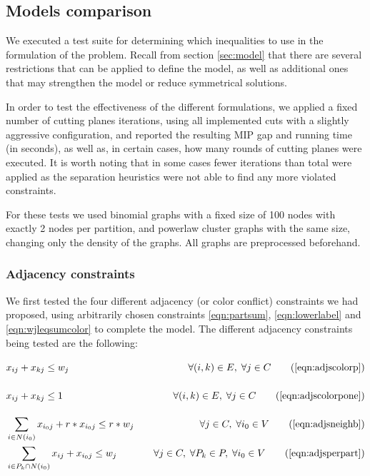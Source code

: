 
\subsection{Models comparison}

We executed a test suite for determining which inequalities to use in the formulation of the problem. Recall from section \ref{sec:model} that there are several restrictions that can be applied to define the model, as well as additional ones that may strengthen the model or reduce symmetrical solutions.

In order to test the effectiveness of the different formulations, we applied a fixed number of cutting planes iterations, using all implemented cuts with a slightly aggressive configuration, and reported the resulting MIP gap and running time (in seconds), as well as, in certain cases, how many rounds of cutting planes were executed. It is worth noting that in some cases fewer iterations than total were applied as the separation heuristics were not able to find any more violated constraints.

For these tests we used binomial graphs with a fixed size of 100 nodes with exactly 2 nodes per partition, and powerlaw cluster graphs with the same size, changing only the density of the graphs. All graphs are preprocessed beforehand.

\subsubsection*{Adjacency constraints}

We first tested the four different adjacency (or color conflict) constraints we had proposed, using arbitrarily chosen constraints \ref{eqn:partsum}, \ref{eqn:lowerlabel} and \ref{eqn:wjleqsumcolor} to complete the model. The different adjacency constraints being tested are the following: 

\begin{align*}
&x_{ij} + x_{kj} \leq w_j \sumheight &\quad \forall (i,k) \in E, \; \forall j \in C \tag{\ref{eqn:adjscolorp}} \\
&x_{ij} + x_{kj} \leq 1 \sumheight &\quad \forall (i,k) \in E, \; \forall j \in C \tag{\ref{eqn:adjscolorpone}} \\
&\sum_{i \in N(i_0)} x_{i_0j} + r * x_{i_0j} \leq r * w_j &\quad \forall j \in C, \; \forall i_0 \in V \tag{\ref{eqn:adjsneighb}} \\
&\sum_{i \in P_k \cap N(i_0)} x_{ij} + x_{i_0j} \leq w_j &\quad \forall j \in C, \; \forall P_k \in P, \; \forall i_0 \in V \tag{\ref{eqn:adjsperpart}} 
\end{align*}

